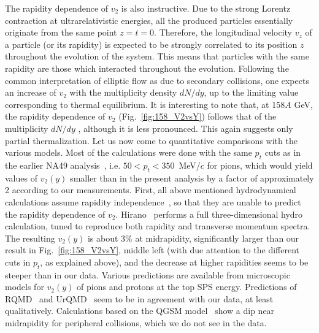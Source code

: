 \documentclass[aps,prc,superscriptaddress,showpacs,floatfix,nofootinbib]{revtex4}
\begin{document}
The rapidity dependence of $v_2$ is also instructive.  Due to the
strong Lorentz contraction at ultrarelativistic energies, all the
produced particles essentially originate from the same point
$z=t=0$. Therefore, the longitudinal velocity $v_z$ of a particle (or
its rapidity) is expected to be strongly correlated to its position
$z$ throughout the evolution of the system.  This means that particles
with the same rapidity are those which interacted throughout the
evolution.  Following the common interpretation of elliptic flow as
due to secondary collisions, one expects an increase of $v_2$ with the
multiplicity density $dN/dy$, up to the limiting value corresponding
to thermal equilibrium.  It is interesting to note that, at 158$A$
GeV, the rapidity dependence of $v_2$ (Fig.~\ref{fig:158_V2vsY})
follows that of the multiplicity $dN/dy$
\cite{crosssections}, although it is less pronounced.  This again
suggests only partial thermalization.  Let us now come to quantitative
comparisons with the various models. Most of the calculations were
done with the same $p_t$ cuts as in the earlier NA49
analysis~\cite{NA49PRL}, i.e. $50<p_t<350$~MeV/$c$ for pions, which
would yield values of $v_2(y)$ smaller than in the present analysis by
a factor of approximately 2 according to our measurements.  First, all
above mentioned hydrodynamical calculations assume rapidity
independence~\cite{Bjorken:1982qr}, so that they are unable to predict
the rapidity dependence of $v_2$.  Hirano~\cite{Hirano:2000eu}
performs a full three-dimensional hydro calculation, tuned to
reproduce both rapidity and transverse momentum spectra. The resulting
$v_2(y)$ is about $3\%$ at midrapidity, significantly larger than our
result in Fig.~\ref{fig:158_V2vsY}, middle left (with due attention to
the different cuts in $p_t$, as explained above), and the decrease at
higher rapidities seems to be steeper than in our data.  Various
predictions are available from microscopic models for $v_2(y)$ of
pions and protons at the top SPS energy.  Predictions of
RQMD~\cite{Liu:1998yc} and UrQMD~\cite{Soff:1999yg} seem to be in
agreement with our data, at least qualitatively.  Calculations based
on the QGSM model~\cite{Bravina:2000dg} show a dip near midrapidity
for peripheral collisions, which we do not see in the data.
\end{document}
